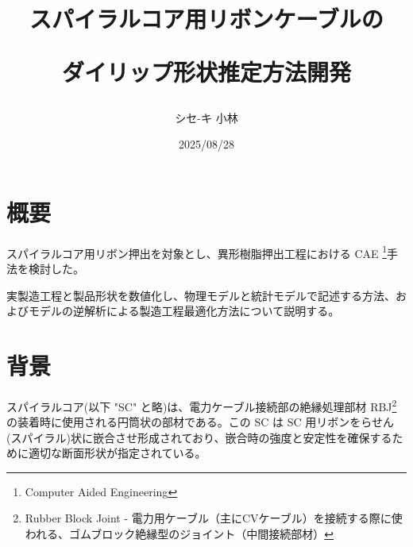 \documentclass[
  report,
  a4paper,
  12pt,
  paperwidth=210mm,
  paperheight=297mm,
  hoffset=0mm,
  voffset=0mm,
  textwidth=175mm, %
  textheight=267mm %
]{jlreq}
\begin{document}
\title{
スパイラルコア用リボンケーブルの

ダイリップ形状推定方法開発
}
\author{シセ-キ 小林}
\date{2025/08/28}
\maketitle

\chapter{概要}
スパイラルコア用リボン押出を対象とし、異形樹脂押出工程における CAE \footnote{Computer Aided Engineering}手法を検討した。

実製造工程と製品形状を数値化し、物理モデルと統計モデルで記述する方法、およびモデルの逆解析による製造工程最適化方法について説明する。

\chapter{背景}
スパイラルコア(\small{以下 "SC" と略})は、電力ケーブル接続部の絶縁処理部材 RBJ\footnote{Rubber Block Joint - 電力用ケーブル（主にCVケーブル）を接続する際に使われる、ゴムブロック絶縁型のジョイント（中間接続部材）} の装着時に使用される円筒状の部材である。この SC は SC 用リボンをらせん(\small{スパイラル})状に嵌合させ形成されており、嵌合時の強度と安定性を確保するために適切な断面形状が指定されている。
\end{document}

